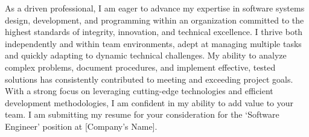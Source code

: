 \documentclass[11pt, a4paper]{awesome-cv}
\begin{document}
\begin{cvletter}

    \large As a driven professional, I am eager to advance my expertise in software systems design, development, and programming within an organization committed to the highest standards of integrity, innovation, and technical excellence. I thrive both independently and within team environments, adept at managing multiple tasks and quickly adapting to dynamic technical challenges. My ability to analyze complex problems, document procedures, and implement effective, tested solutions has consistently contributed to meeting and exceeding project goals. With a strong focus on leveraging cutting-edge technologies and efficient development methodologies, I am confident in my ability to add value to your team. I am submitting my resume for your consideration for the ‘Software Engineer’ position at [Company's Name].

\end{cvletter}

\makeletterclosing
\end{document}
